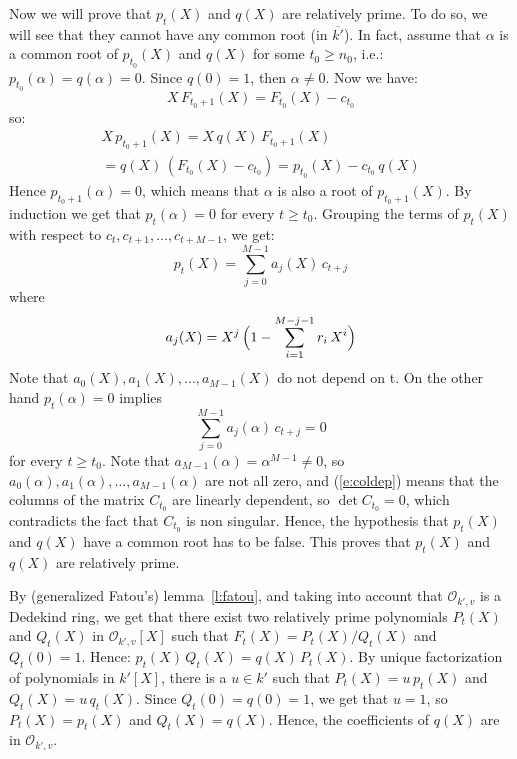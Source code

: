 Now we will prove that $p_t(X)$ and $q(X)$ are relatively 
prime. To do so, we will see that they cannot have any 
common root (in $\overline {k'}$). In fact, assume 
that $\alpha$ is a common root of $p_{t_0}(X)$ and $q(X)$ 
for some $t_0 \geq n_0$, i.e.: 
$p_{t_0}(\alpha) = q(\alpha) = 0$. 
Since $q(0)=1$, then $\alpha \neq 0$. Now we have:
\begin{equation}
X\,F_{t_0+1}(X) = F_{t_0}(X) - c_{t_0}
\end{equation}
so:
\begin{multline}
X\,p_{t_0+1}(X) = X\,q(X)\,F_{t_0+1}(X) \\
= q(X)\,(F_{t_0}(X) - c_{t_0}) = p_{t_0}(X) - c_{t_0}\,q(X)
\end{multline}
Hence $p_{t_0+1}(\alpha) = 0$, which means that $\alpha$ is 
also a root of $p_{t_0+1}(X)$. By induction we get that 
$p_t(\alpha) = 0$ for every $t \geq t_0$. Grouping the 
terms of $p_t(X)$ with respect to $c_t,c_{t+1},\dots,c_{t+M-1}$, 
we get:
\begin{equation}
p_t(X) = \sum_{j=0}^{M-1} a_j(X)\,c_{t+j}
\end{equation}
where 
\begin{equation}
a_j(X) = X^j\,\Bigl( 1 - \sum_{i=1}^{M-j-1} r_i\,X^i \Bigr)
\end{equation}
Note that $a_0(X),a_1(X),\dots,a_{M-1}(X)$ do not depend on t. 
On the other hand $p_t(\alpha)=0$ implies
\begin{equation}
\label{e:coldep}
\sum_{j=0}^{M-1} a_j(\alpha)\,c_{t+j} = 0
\end{equation}
for every $t \geq t_0$. Note that $a_{M-1}(\alpha)=\alpha^{M-1}
\neq 0$, so $a_0(\alpha),a_1(\alpha),\dots,a_{M-1}(\alpha)$ 
are not all zero, and (\ref{e:coldep}) means that the columns 
of the matrix $C_{t_0}$ are linearly dependent, so 
$\det C_{t_0}=0$, which contradicts the fact that $C_{t_0}$ 
is non singular. Hence, the hypothesis that $p_t(X)$ and 
$q(X)$ have a common root has to be false. This proves that 
$p_t(X)$ and $q(X)$ are relatively prime. 

By (generalized Fatou's) lemma~\ref{l:fatou}, 
and taking into account that 
$\mathcal O_{k',v}$ is a Dedekind ring, 
we get that there exist two relatively prime 
polynomials $P_t(X)$ and $Q_t(X)$ in 
$\mathcal O_{k',v}[X]$ such that 
$F_t(X) = P_t(X)/Q_t(X)$ and $Q_t(0)=1$. Hence: 
$p_t(X)\,Q_t(X) = q(X)\,P_t(X)$. By unique factorization 
of polynomials in $k'[X]$, there is a $u \in k'$ such that 
$P_t(X) = u\,p_t(X)$ and $Q_t(X) = u\,q_t(X)$. Since 
$Q_t(0)=q(0)=1$, we get that $u=1$, so 
$P_t(X) = p_t(X)$ and $Q_t(X) = q(X)$. 
Hence, the coefficients of $q(X)$ are in 
$\mathcal O_{k',v}$. 

